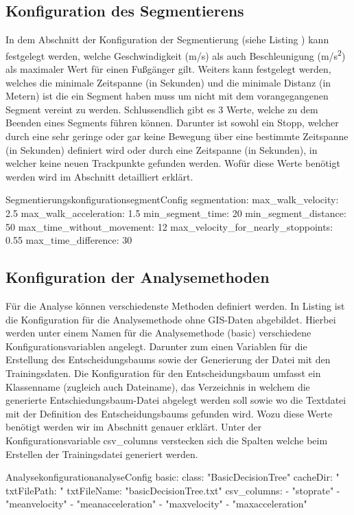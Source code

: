 \subsection{Konfiguration des Segmentierens}
In dem Abschnitt der Konfiguration der Segmentierung (siehe Listing ) kann festgelegt werden, welche Geschwindigkeit (m/s) als auch Beschleunigung (m/s\textsuperscript{2}) als maximaler Wert für einen Fußgänger gilt. Weiters kann festgelegt werden, welches die minimale Zeitspanne (in Sekunden) und die minimale Distanz (in Metern) ist die ein Segment haben muss um nicht mit dem vorangegangenen Segment vereint zu werden. Schlussendlich gibt es 3 Werte, welche zu dem Beenden eines Segments führen können. Darunter ist sowohl ein Stopp, welcher durch eine sehr geringe oder gar keine Bewegung über eine bestimmte Zeitspanne (in Sekunden) definiert wird oder durch eine Zeitspanne (in Sekunden), in welcher keine neuen Trackpunkte gefunden werden. Wofür diese Werte benötigt werden wird im Abschnitt  detailliert erklärt.

\begin{code}[]{Segmentierungskonfiguration}{segmentConfig}
  segmentation:
    max_walk_velocity: 2.5
    max_walk_acceleration: 1.5
    min_segment_time: 20
    min_segment_distance: 50
    max_time_without_movement: 12
    max_velocity_for_nearly_stoppoints: 0.55
    max_time_difference: 30
\end{code}

\subsection{Konfiguration der Analysemethoden}
Für die Analyse können verschiedenste Methoden definiert werden. In Listing  ist die Konfiguration für die Analysemethode ohne GIS-Daten abgebildet. Hierbei werden unter einem Namen für die Analysemethode (basic) verschiedene Konfigurationsvariablen angelegt. Darunter zum einen Variablen für die Erstellung des Entscheidungsbaums sowie der Generierung der Datei mit den Trainingsdaten. Die Konfiguration für den Entscheidungsbaum umfasst ein Klassenname (zugleich auch Dateiname), das Verzeichnis in welchem die generierte Entschiedungsbaum-Datei abgelegt werden soll sowie wo die Textdatei mit der Definition des Entscheidungsbaums gefunden wird. Wozu diese Werte benötigt werden wir im Abschnitt  genauer erklärt. Unter der Konfigurationsvariable csv\_columns verstecken sich die Spalten welche beim Erstellen der Trainingsdatei generiert werden.

\begin{code}[]{Analysekonfiguration}{analyseConfig}
    basic:
      class: "BasicDecisionTree"
      cacheDir: "%
      txtFilePath: "%
      txtFileName: "basicDecisionTree.txt"
      csv_columns:
        - "stoprate"
        - "meanvelocity"
        - "meanacceleration"
        - "maxvelocity"
        - "maxacceleration"
\end{code}